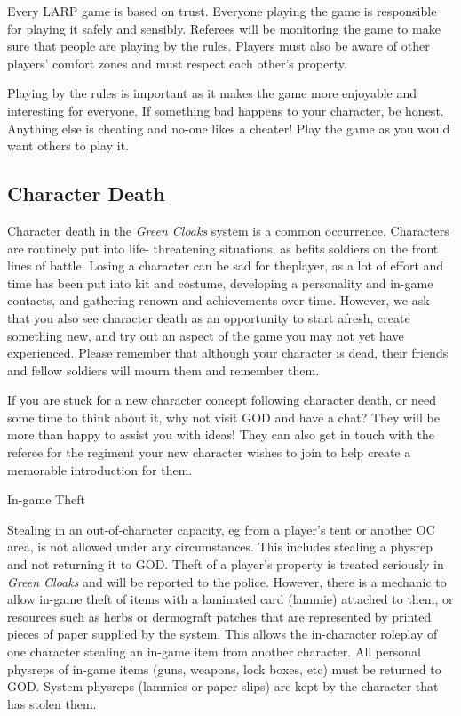 Every LARP game is based on trust. Everyone playing the game is responsible for playing it safely and sensibly. Referees will be monitoring the game to make sure that people are playing by the rules. Players must also be aware of other players' comfort zones and must respect each other's property.

Playing by the rules is important as it makes the game more enjoyable and interesting for everyone. If something bad happens to your character, be honest. Anything else is cheating and no-one likes a cheater! Play the game as you would want others to play it.

\subsection{Character Death}

Character death in the \textit{Green Cloaks} system is a common occurrence. Characters are routinely put into life- threatening situations, as befits soldiers on the front lines of battle. Losing a character can be sad for theplayer, as a lot of effort and time has been put into kit and costume, developing a personality and in-game contacts, and gathering renown and achievements over time. However, we ask that you also see character death as an opportunity to start afresh, create something new, and try out an aspect of the game you may not yet have experienced. Please remember that although your character is dead, their friends and fellow soldiers will mourn them and remember them.

If you are stuck for a new character concept following character death, or need some time to think about it, why not visit GOD and have a chat? They will be more than happy to assist you with ideas! They can also get in touch with the referee for the regiment your new character wishes to join to help create a memorable introduction for them.

In-game Theft

Stealing in an out-of-character capacity, eg from a player's tent or another OC area, is not allowed under any circumstances. This includes stealing a physrep and not returning it to GOD. Theft of a player's property is treated seriously in \textit{Green Cloaks} and will be reported to the police. However, there is a mechanic to allow in-game theft of items with a laminated card (lammie) attached to them, or resources such as herbs or dermograft patches that are represented by printed pieces of paper supplied by the system. This allows the in-character roleplay of one character stealing an in-game item from another character. All personal physreps of in-game items (guns, weapons, lock boxes, etc) must be returned to GOD. System physreps (lammies or paper slips) are kept by the character that has stolen them.

